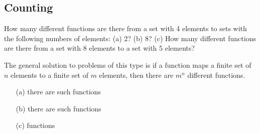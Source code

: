 \begin{questions}

\section*{Counting}



 How many different functions are there from a set with 4 elements to sets with the following numbers of elements: (a) 2? (b) 8? (c) How many different functions are there from a set with 8 elements to a set with 5 elements? 
  \ifprintanswers
    \vspace{-10pt}
  \fi
  \begin{solution}
    The general solution to problems of this type is if a
    function maps a finite set of $n$ elements to a finite
    set of $m$ elements, then there are $m^n$ different
    functions.
    \begin{itemize}[itemsep=0pt, topsep=0pt]
        \item[(a)] there are  such functions
        \item[(b)] there are  such functions
        \item[(c)]  functions
    \end{itemize}
\end{solution}






\end{questions}
